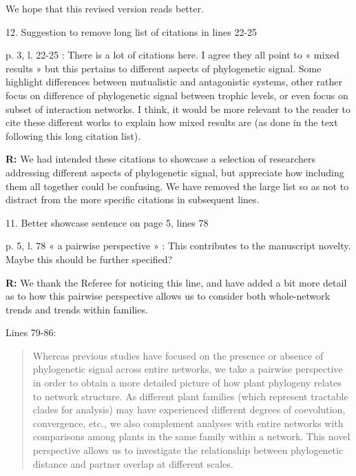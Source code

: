 \documentclass[12pt]{letter}
\newenvironment{refquote}{\bigskip \begin{it}}{\end{it}\smallskip}
\begin{document}
	  	We hope that this revised version reads better.


	12. Suggestion to remove long list of citations in lines 22-25


		\begin{refquote}
			p. 3, l. 22-25 : There is a lot of citations here. I agree they all point to « mixed results » but this pertains to different aspects of phylogenetic signal. Some highlight differences between mutualistic and antagonistic systems, other rather focus on difference of phylogenetic signal between trophic levels, or even focus on subset of interaction networks. I think, it would be more relevant to the reader to cite these different works to explain how mixed results are (as done in the text following this long citation list).
		\end{refquote}


		\textbf{R:} We had intended these citations to showcase a selection of researchers addressing different aspects of phylogenetic signal, but appreciate how including them all together could be confusing. We have removed the large list so as not to distract from the more specific citations in subsequent lines.


	11. Better showcase sentence on page 5, lines 78


		\begin{refquote}
			p. 5, l. 78 « a pairwise perspective » : This contributes to the manuscript novelty. Maybe this should be further specified?
		\end{refquote}


		\textbf{R:} We thank the Referee for noticing this line, and have added a bit more detail as to how this pairwise perspective allows us to consider both whole-network trends and trends within families.


		Lines 79-86:


		\begin{quotation}

			Whereas previous 
			studies have focused on the presence or absence of phylogenetic
			signal across entire networks, we take a pairwise perspective in
			order to obtain a more detailed picture of how plant phylogeny
			relates to network structure. As different plant families (which represent tractable clades for analysis) may have experienced different degrees of coevolution, convergence, etc., we also complement analyses with entire networks with comparisons among plants in the same family within a network. 
			This novel perspective allows us to investigate the relationship between phylogenetic distance and partner overlap at different scales. 

		\end{quotation}
\end{document}
